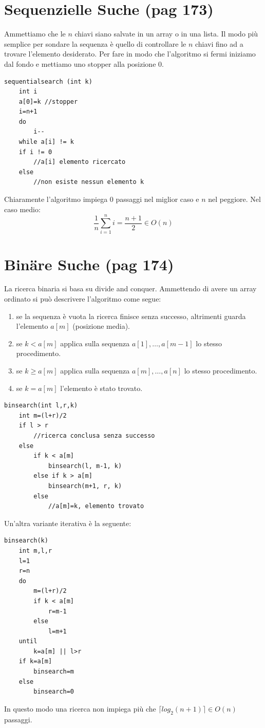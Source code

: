 \documentclass[a4paper]{book}
\begin{document}
\section{Sequenzielle Suche (pag 173)}
Ammettiamo che le $n$ chiavi siano salvate in un array o in una lista. Il modo più semplice per sondare la sequenza è quello di controllare le $n$ chiavi fino ad a trovare l'elemento desiderato. Per fare in modo che l'algoritmo si fermi iniziamo dal fondo e mettiamo uno stopper alla posizione 0.
\begin{lstlisting}
sequentialsearch (int k)
	int i
	a[0]=k //stopper
	i=n+1
	do
		i--
	while a[i] != k
	if i != 0
		//a[i] elemento ricercato
	else
		//non esiste nessun elemento k		
\end{lstlisting} 
Chiaramente l'algoritmo impiega 0 passaggi nel miglior caso e $n$ nel peggiore. Nel caso medio:
$$ \frac{1}{n} \sum_{i=1}^n i = \frac{n+1}{2} \in O(n) $$
\section{Binäre Suche (pag 174)}
La ricerca binaria si basa su divide and conquer. Ammettendo di avere un array ordinato si può descrivere l'algoritmo come segue:
\begin{enumerate}
\item se la sequenza è vuota la ricerca finisce senza successo, altrimenti guarda l'elemento $a[m]$ (posizione media).
\item se $k < a[m]$ applica sulla sequenza $a[1],\dots, a[m-1]$ lo stesso procedimento.
\item se $k \geq a[m]$ applica sulla sequenza $a[m],\dots, a[n]$ lo stesso procedimento.
\item se $k = a[m]$ l'elemento è stato trovato.
\end{enumerate}
\begin{lstlisting}
binsearch(int l,r,k)
	int m=(l+r)/2
	if l > r
		//ricerca conclusa senza successo
	else
		if k < a[m]
			binsearch(l, m-1, k)
		else if k > a[m]
			binsearch(m+1, r, k)	
		else
			//a[m]=k, elemento trovato				
\end{lstlisting}
Un'altra variante iterativa è la seguente:
\begin{lstlisting}
binsearch(k)
	int m,l,r
	l=1
	r=n
	do
		m=(l+r)/2
		if k < a[m]
			r=m-1
		else
			l=m+1
	until
		k=a[m] || l>r
	if k=a[m]
		binsearch=m
	else
		binsearch=0								
\end{lstlisting}
In questo modo una ricerca non impiega più che $\lceil log_2(n+1) \rceil \in O(n) $ passaggi.
\end{document}
